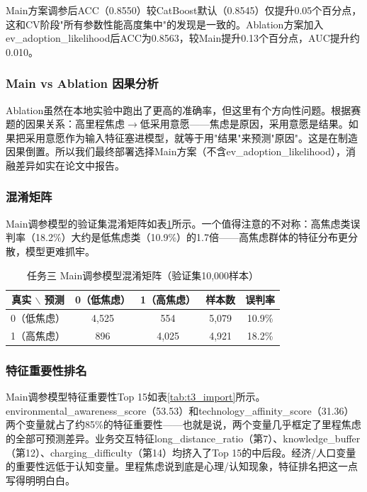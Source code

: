 Main方案调参后ACC（0.8550）较CatBoost默认（0.8545）仅提升0.05个百分点，这和CV阶段"所有参数性能高度集中"的发现是一致的。Ablation方案加入ev\_adoption\_likelihood后ACC为0.8563，较Main提升0.13个百分点，AUC提升约0.010。

\subsubsection{Main vs Ablation 因果分析}

Ablation虽然在本地实验中跑出了更高的准确率，但这里有个方向性问题。根据赛题的因果关系：高里程焦虑$\to$低采用意愿——焦虑是原因，采用意愿是结果。如果把采用意愿作为输入特征塞进模型，就等于用"结果"来预测"原因"。这是在制造因果倒置。所以我们最终部署选择Main方案（不含ev\_adoption\_likelihood），消融差异如实在论文中报告。

\subsubsection{混淆矩阵}

Main调参模型的验证集混淆矩阵如表\ref{tab:t3_conf}所示。一个值得注意的不对称：高焦虑类误判率（18.2\%）大约是低焦虑类（10.9\%）的1.7倍——高焦虑群体的特征分布更分散，模型更难抓牢。

\begin{table}[H]
\centering
\caption{任务三 Main调参模型混淆矩阵（验证集10,000样本）}
\label{tab:t3_conf}
\begin{tabular}{ccccc}
\toprule
\textbf{真实 $\backslash$ 预测} & \textbf{0（低焦虑）} & \textbf{1（高焦虑）} & \textbf{样本数} & \textbf{误判率} \\
\midrule
0（低焦虑） & 4,525 & 554 & 5,079 & 10.9\% \\
1（高焦虑） & 896 & 4,025 & 4,921 & 18.2\% \\
\bottomrule
\end{tabular}
\end{table}

\subsubsection{特征重要性排名}

Main调参模型特征重要性Top 15如表\ref{tab:t3_import}所示。environmental\_awareness\_score（53.53）和technology\_affinity\_score（31.36）两个变量就占了约85\%的特征重要性——也就是说，两个变量几乎框定了里程焦虑的全部可预测差异。业务交互特征long\_distance\_ratio（第7）、knowledge\_buffer（第12）、charging\_difficulty（第14）均挤入了Top 15的中后段。经济/人口变量的重要性远低于认知变量。里程焦虑说到底是心理/认知现象，特征排名把这一点写得明明白白。

